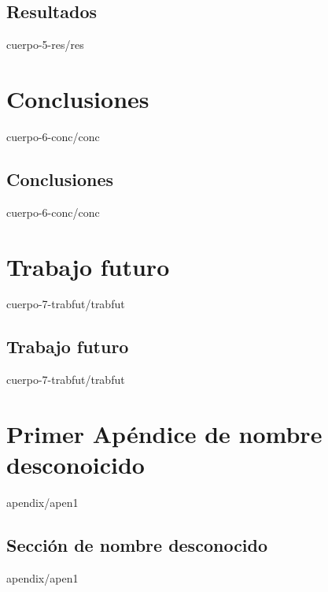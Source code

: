 \documentclass[epsbased,copyright,final,printable,covers,extendedindex,firstnumbered,tfg,gnuplot]{tfgtfmthesisuam}
\begin{document}
  \section{Resultados\label{SEC:RES_S1}}{cuerpo-5-res/res}

\chapter{Conclusiones\label{CAP:CONC}}{cuerpo-6-conc/conc}
  \section{Conclusiones\label{SEC:CONC_S1}}{cuerpo-6-conc/conc}

\chapter{Trabajo futuro\label{CAP:TRABFUT}}{cuerpo-7-trabfut/trabfut}
  \section{Trabajo futuro\label{SEC:TRABFUT_S1}}{cuerpo-7-trabfut/trabfut}

\appendix
\chapter{Primer Apéndice de nombre desconoicido\label{CAP:APEN1}}{apendix/apen1}
  \section{Sección de nombre desconocido\label{SEC:APEN1_S1}}{apendix/apen1}


\end{document}
